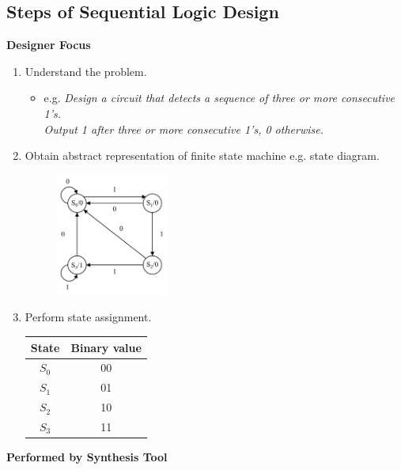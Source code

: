 \documentclass[a4paper]{article}
\begin{document}
\subsection{Steps of Sequential Logic Design}
\textbf{Designer Focus}
\begin{enumerate}
    \item Understand the problem.
    \begin{itemize}[label=$\circ$]
        \item e.g. \textit{Design a circuit that detects a sequence of three or more consecutive 1's.\\ Output 1 after three or more consecutive 1's, 0 otherwise.}
    \end{itemize}
    \item Obtain abstract representation of finite state machine e.g. state diagram.
    \begin{figure}[H]
    \centering
    \includegraphics[width=0.35\textwidth]{seq-logic-2.png}
\end{figure}
    \item Perform state assignment.
    \begin{table}[H]
    \centering
    \begin{tabular}{cc}
        \textbf{State} & \textbf{Binary value} \\ \hline
        $S_0$ & 00 \\
        $S_1$ & 01 \\
        $S_2$ & 10 \\
        $S_3$ & 11
    \end{tabular}
    \end{table}
\end{enumerate}
\textbf{Performed by Synthesis Tool}
\end{document}
